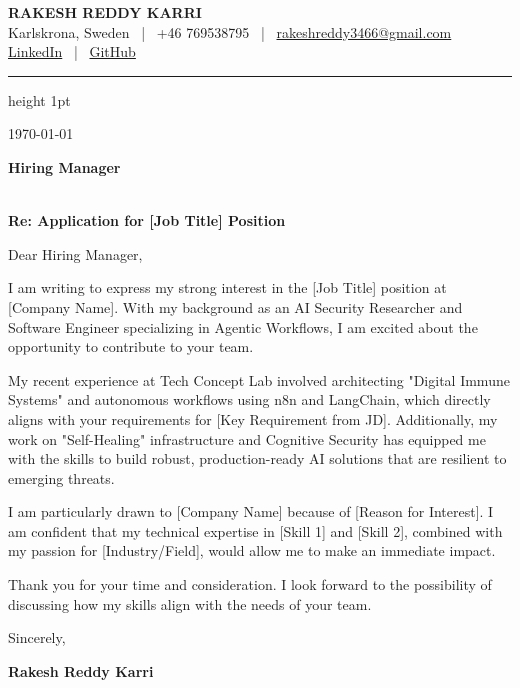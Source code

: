 \documentclass[11pt, a4paper]{article}
\begin{document}
\begin{center}
    {\LARGE\bfseries\color{primaryBlue} RAKESH REDDY KARRI} \\
    \vspace{0.5em}
    \small Karlskrona, Sweden \ | \ +46 769538795 \ | \ \href{mailto:rakeshreddy3466@gmail.com}{rakeshreddy3466@gmail.com} \\
    \href{https://www.linkedin.com/in/rakesh-reddy-553033256/}{LinkedIn} \ | \ \href{https://github.com/rakeshreddy3466}{GitHub}
\end{center}

\vspace{0.5em}
{\color{primaryBlue}\hrule height 1pt} %
\vspace{1em}


\today %

\vspace{1em}

\textbf{Hiring Manager} \\
[Company Name] \\
[Company Address / Location]

\vspace{1.5em}

\textbf{Re: Application for [Job Title] Position}

\vspace{1em}

Dear Hiring Manager,


I am writing to express my strong interest in the [Job Title] position at [Company Name]. With my background as an AI Security Researcher and Software Engineer specializing in Agentic Workflows, I am excited about the opportunity to contribute to your team.

My recent experience at Tech Concept Lab involved architecting "Digital Immune Systems" and autonomous workflows using n8n and LangChain, which directly aligns with your requirements for [Key Requirement from JD]. Additionally, my work on "Self-Healing" infrastructure and Cognitive Security has equipped me with the skills to build robust, production-ready AI solutions that are resilient to emerging threats.

I am particularly drawn to [Company Name] because of [Reason for Interest]. I am confident that my technical expertise in [Skill 1] and [Skill 2], combined with my passion for [Industry/Field], would allow me to make an immediate impact.

Thank you for your time and consideration. I look forward to the possibility of discussing how my skills align with the needs of your team.

\vspace{1em}

Sincerely,

\vspace{1em}

\textbf{Rakesh Reddy Karri}
\end{document}

